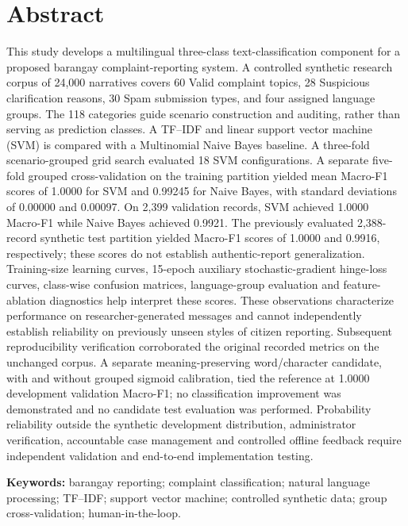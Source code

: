 \documentclass[12pt,oneside,openany]{book}
\begin{document}
\chapter*{Abstract}
This study develops a multilingual three-class text-classification component for a proposed barangay complaint-reporting system. A controlled synthetic research corpus of 24,000 narratives covers 60 Valid complaint topics, 28 Suspicious clarification reasons, 30 Spam submission types, and four assigned language groups. The 118 categories guide scenario construction and auditing, rather than serving as prediction classes. A TF--IDF and linear support vector machine (SVM) is compared with a Multinomial Naive Bayes baseline. A three-fold scenario-grouped grid search evaluated 18 SVM configurations. A separate five-fold grouped cross-validation on the training partition yielded mean Macro-F1 scores of 1.0000 for SVM and 0.99245 for Naive Bayes, with standard deviations of 0.00000 and 0.00097. On 2,399 validation records, SVM achieved 1.0000 Macro-F1 while Naive Bayes achieved 0.9921. The previously evaluated 2,388-record synthetic test partition yielded Macro-F1 scores of 1.0000 and 0.9916, respectively; these scores do not establish authentic-report generalization. Training-size learning curves, 15-epoch auxiliary stochastic-gradient hinge-loss curves, class-wise confusion matrices, language-group evaluation and feature-ablation diagnostics help interpret these scores. These observations characterize performance on researcher-generated messages and cannot independently establish reliability on previously unseen styles of citizen reporting. Subsequent reproducibility verification corroborated the original recorded metrics on the unchanged corpus. A separate meaning-preserving word/character candidate, with and without grouped sigmoid calibration, tied the reference at 1.0000 development validation Macro-F1; no classification improvement was demonstrated and no candidate test evaluation was performed. Probability reliability outside the synthetic development distribution, administrator verification, accountable case management and controlled offline feedback require independent validation and end-to-end implementation testing. 
\par\medskip\textbf{Keywords:} barangay reporting; complaint classification; natural language processing; TF--IDF; support vector machine; controlled synthetic data; group cross-validation; human-in-the-loop.
\tableofcontents
\listoffigures
\listoftables
\mainmatter








\backmatter
\renewcommand{\bibname}{References}
\cleardoublepage{}

\end{document}
